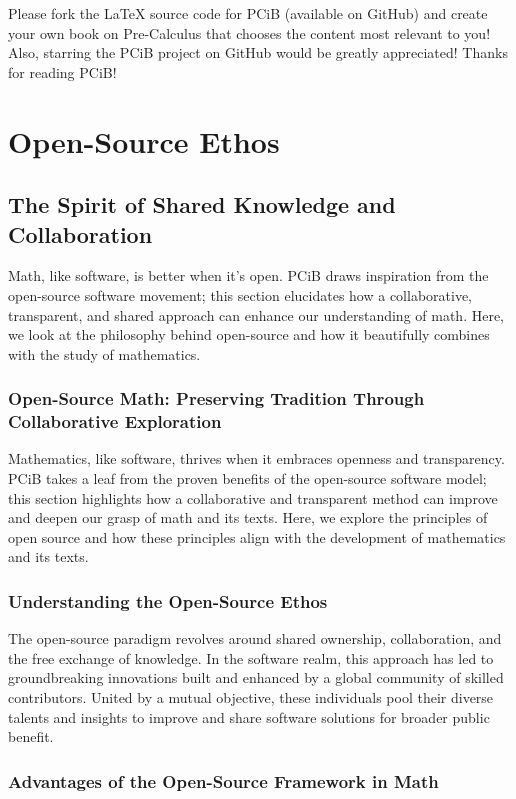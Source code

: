 \documentclass[a4paper,12pt]{book}
\begin{document}
\bigskip
\noindent
Please fork the \LaTeX{} source code for PCiB (available on GitHub) and create your own book on Pre-Calculus that chooses the content most relevant to you! Also, starring the PCiB project on GitHub would be greatly appreciated! Thanks for reading PCiB!

\chapter{Open-Source Ethos}
\section*{The Spirit of Shared Knowledge and Collaboration}
Math, like software, is better when it's open. PCiB draws inspiration from the open-source software movement; this section elucidates how a collaborative, transparent, and shared approach can enhance our understanding of math. Here, we look at the philosophy behind open-source and how it beautifully combines with the study of mathematics.

\subsection*{Open-Source Math: Preserving Tradition Through Collaborative Exploration}
Mathematics, like software, thrives when it embraces openness and transparency. PCiB takes a leaf from the proven benefits of the open-source software model; this section highlights how a collaborative and transparent method can improve and deepen our grasp of math and its texts. Here, we explore the principles of open source and how these principles align with the development of mathematics and its texts.

\subsection*{Understanding the Open-Source Ethos}
The open-source paradigm revolves around shared ownership, collaboration, and the free exchange of knowledge. In the software realm, this approach has led to groundbreaking innovations built and enhanced by a global community of skilled contributors. United by a mutual objective, these individuals pool their diverse talents and insights to improve and share software solutions for broader public benefit.

\subsection*{Advantages of the Open-Source Framework in Math}
\end{document}
